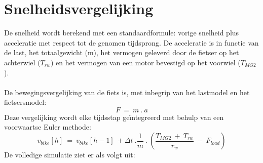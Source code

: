 \section{Snelheidsvergelijking}
\noindent De snelheid wordt berekend met een standaardformule: vorige snelheid plus acceleratie met respect tot de genomen tijdsprong. De acceleratie is in functie van de last, het totaalgewicht (m), het vermogen geleverd door de fietser op het achterwiel ($T_{rw}$) en het vermogen van een motor bevestigd op het voorwiel ($T_{MG2}$). 
\\\\
De bewegingsvergelijking van de fiets is, met inbegrip van het lastmodel en het fietsersmodel:
\[F \ = \  m \ . \ a \]
Deze vergelijking wordt elke tijdsstap geïntegreerd met behulp van een voorwaartse Euler methode:
\[v_{bike}[h] \ = \ v_{bike}[h-1] \ + \Delta t  \ . \frac{1}{m} \ . \ (\frac{T_{MG2} \ + \ T_{rw}}{r_w} \ - \ F_{load})\]
De volledige simulatie ziet er als volgt uit:
\\\\

